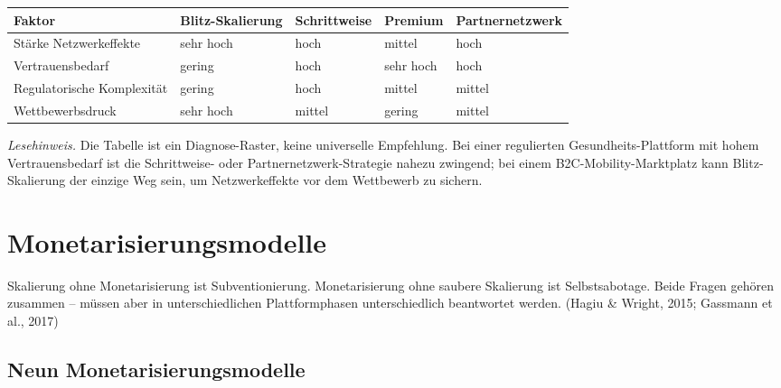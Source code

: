 \documentclass[11pt,a4paper,oneside]{article}
\newcommand{\quelle}[1]{{\footnotesize\color{lpGray}(#1)}}
\begin{document}
\begin{tabularx}{\linewidth}{@{}lXXXX@{}}
\toprule
\textbf{Faktor} & \textbf{Blitz-Skalierung} & \textbf{Schrittweise} & \textbf{Premium} & \textbf{Partnernetzwerk} \\
\midrule
Stärke Netzwerkeffekte & sehr hoch & hoch & mittel & hoch \\
Vertrauensbedarf & gering & hoch & sehr hoch & hoch \\
Regulatorische Komplexität & gering & hoch & mittel & mittel \\
Wettbewerbsdruck & sehr hoch & mittel & gering & mittel \\
\bottomrule
\end{tabularx}

\medskip

\noindent\emph{Lesehinweis.} Die Tabelle ist ein Diagnose-Raster, keine universelle Empfehlung. Bei einer regulierten Gesundheits-Plattform mit hohem Vertrauensbedarf ist die Schrittweise- oder Partnernetzwerk-Strategie nahezu zwingend; bei einem B2C-Mobility-Marktplatz kann Blitz-Skalierung der einzige Weg sein, um Netzwerkeffekte vor dem Wettbewerb zu sichern.

\section{Monetarisierungsmodelle}

Skalierung ohne Monetarisierung ist Subventionierung. Monetarisierung ohne saubere Skalierung ist Selbstsabotage. Beide Fragen gehören zusammen -- müssen aber in unterschiedlichen Plattformphasen unterschiedlich beantwortet werden. \quelle{Hagiu \& Wright, 2015; Gassmann et al., 2017}

\subsection{Neun Monetarisierungsmodelle}
\end{document}
